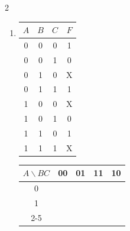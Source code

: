 \documentclass[12pt,a4paper]{article}
\begin{document}
\begin{multicols}{2}
\begin{enumerate}[label=\alph*)]
  \item \begin{minipage}[t]{\linewidth}
    \begin{center}
      \begin{tabular}{ccc|c}
        \toprule
        $A$ & $B$ & $C$ & $F$ \\
        \midrule
        0 & 0 & 0 & 1 \\
        0 & 0 & 1 & 0 \\
        0 & 1 & 0 & X \\
        0 & 1 & 1 & 1 \\
        1 & 0 & 0 & X \\
        1 & 0 & 1 & 0 \\
        1 & 1 & 0 & 1 \\
        1 & 1 & 1 & X \\
        \bottomrule
      \end{tabular}
    \end{center}

    \begin{center}
      \begin{tabular}{c|c|c|c|c|}
        $A \backslash BC$ & 00 & 01 & 11 & \multicolumn{1}{c}{10} \\
        \hline
        0 & \phantom{0} & \phantom{0} & \phantom{0} & \phantom{0} \\
        \hline
        1 & \phantom{0} & \phantom{0} & \phantom{0} & \phantom{0} \\
        \cline{2-5}
      \end{tabular}
    \end{center}
  \end{minipage}


\end{enumerate}
\end{multicols}
\end{document}
